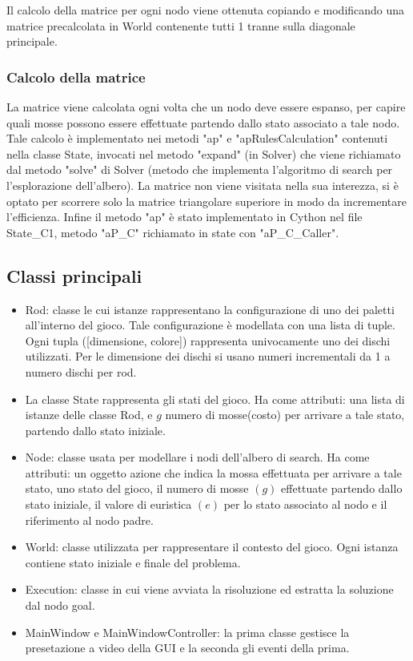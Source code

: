 \documentclass{article}
\begin{document}
\noindent Il calcolo della matrice per ogni nodo viene ottenuta copiando e modificando una matrice precalcolata in World contenente tutti 1 tranne sulla diagonale principale.

\subsubsection{Calcolo della matrice}

La matrice viene calcolata ogni volta che un nodo deve essere espanso, per capire quali mosse possono essere effettuate partendo dallo stato associato a tale nodo. Tale calcolo è implementato nei metodi "ap" e "apRulesCalculation" contenuti nella classe State, invocati nel metodo "expand" (in Solver) che viene richiamato dal metodo "solve" di Solver (metodo che implementa l'algoritmo di search per l'esplorazione dell'albero).
La matrice non viene visitata nella sua interezza, si è optato per scorrere solo la matrice triangolare superiore in modo da incrementare l'efficienza. Infine il metodo "ap" è stato implementato in Cython nel file State\_C1, metodo "aP\_C" richiamato in state con "aP\_C\_Caller".

\subsection{Classi principali}

\begin{itemize}
    \item[] Rod: classe le cui istanze rappresentano la configurazione di uno dei paletti all'interno del gioco. 
    Tale configurazione è modellata con una lista di tuple. Ogni tupla ([dimensione, colore]) rappresenta univocamente uno dei dischi utilizzati. Per le dimensione dei dischi si usano numeri incrementali da
    1 a numero dischi per rod. 
    \item[] La classe State rappresenta gli stati del gioco. Ha come attributi: una lista di istanze delle classe Rod, e $g$ numero di mosse(costo) per arrivare a tale stato, partendo dallo stato iniziale.
    \item[] Node: classe usata per modellare i nodi dell'albero di search. Ha come attributi: un oggetto azione che indica la mossa effettuata per arrivare a tale stato, uno stato del gioco, il numero di mosse $(g)$ effettuate partendo dallo stato iniziale, il valore di euristica $(e)$ per lo stato associato al nodo e il riferimento al nodo padre.
    \item[] World: classe utilizzata per rappresentare il contesto del gioco. Ogni istanza contiene stato iniziale e finale del problema.
    \item[] Execution: classe in cui viene avviata la risoluzione ed estratta la soluzione dal nodo goal.
    \item[] MainWindow e MainWindowController: la prima classe gestisce la presetazione a video della GUI e la seconda gli eventi della prima.
\end{itemize} 
\end{document}
